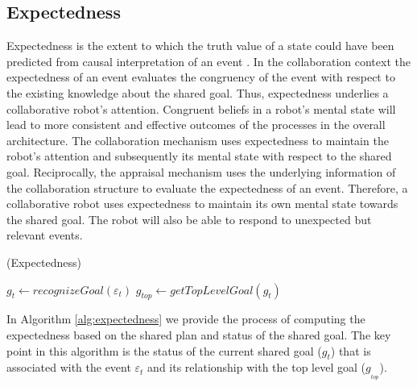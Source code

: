 \vspace*{-2mm}
\subsection{Expectedness}

Expectedness is the extent to which the truth value of a state could have been
predicted from causal interpretation of an event
\cite{marsella:ema-process-model}. In the collaboration context the expectedness
of an event evaluates the congruency of the event with respect to the existing
knowledge about the shared goal. Thus, expectedness underlies a collaborative
robot's attention. Congruent beliefs in a robot's mental state will lead to more
consistent and effective outcomes of the processes in the overall architecture.
The collaboration mechanism uses expectedness to maintain the robot's attention
and subsequently its mental state with respect to the shared goal. Reciprocally,
the appraisal mechanism uses the underlying information of the collaboration
structure to evaluate the expectedness of an event. Therefore, a collaborative
robot uses expectedness to maintain its own mental state towards the shared
goal. The robot will also be able to respond to unexpected but relevant events.

\begin{algorithm}
	\caption{(Expectedness)}
	\label{alg:expectedness}
	\begin{algorithmic}[1]
			\Statex
			\State $\mathit{g}_{t} \gets \textit{recognizeGoal}{(\varepsilon_t)}$
			\State $\mathit{g}_{top} \gets \textit{getTopLevelGoal}{(\mathit{g}_{t})}$
			\Statex
				\State {}
				\Else
					\State {}
				\EndIf
			\Else
					\State {}
				\Else
					\State {}
				\EndIf
			\EndIf
		\EndFunction
	\end{algorithmic}
\end{algorithm}

In Algorithm \ref{alg:expectedness} we provide the process of computing the
expectedness based on the shared plan and status of the shared goal. The key
point in this algorithm is the status of the current shared goal
($\mathit{g}_{t}$) that is associated with the event $\varepsilon_t$ and its
relationship with the top level goal ($\mathit{g}_{_{top}}$).

